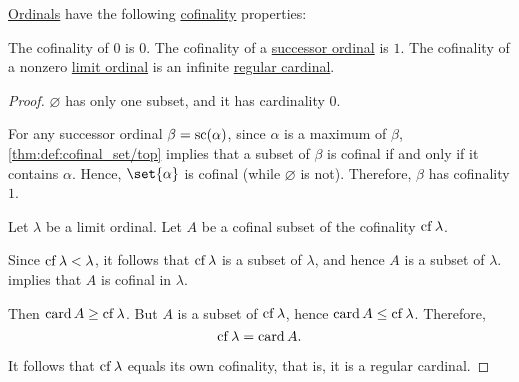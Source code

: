 \begin{proposition}\label{thm:ordinal_cofinality}
  \hyperref[def:ordinal]{Ordinals} have the following \hyperref[def:cofinality]{cofinality} properties:
  \begin{thmenum}
     The cofinality of \( 0 \) is \( 0 \).
     The cofinality of a \hyperref[def:successor_and_limit_ordinal]{successor ordinal} is \( 1 \).
     The cofinality of a nonzero \hyperref[def:successor_and_limit_ordinal]{limit ordinal} is an infinite \hyperref[def:regular_cardinal]{regular cardinal}.
  \end{thmenum}
\end{proposition}
\begin{proof}
   \( \varnothing \) has only one subset, and it has cardinality \( 0 \).

   For any successor ordinal \( \beta = \op{sc}(\alpha) \), since \( \alpha \) is a maximum of \( \beta \), \cref{thm:def:cofinal_set/top} implies that a subset of \( \beta \) is cofinal if and only if it contains \( \alpha \). Hence, \( \set{ \alpha } \) is cofinal (while \( \varnothing \) is not). Therefore, \( \beta \) has cofinality \( 1 \).

   Let \( \lambda \) be a limit ordinal. Let \( A \) be a cofinal subset of the cofinality \( \op{cf} \lambda \).

  Since \( \op{cf} \lambda < \lambda \), it follows that \( \op{cf} \lambda \) is a subset of \( \lambda \), and hence \( A \) is a subset of \( \lambda \).  implies that \( A \) is cofinal in \( \lambda \).

  Then \( \card A \geq \op{cf} \lambda \). But \( A \) is a subset of \( \op{cf} \lambda \), hence \( \card A \leq \op{cf} \lambda \). Therefore,
  \begin{equation*}
    \op{cf} \lambda = \card A.
  \end{equation*}

  It follows that \( \op{cf} \lambda \) equals its own cofinality, that is, it is a regular cardinal.
\end{proof}

